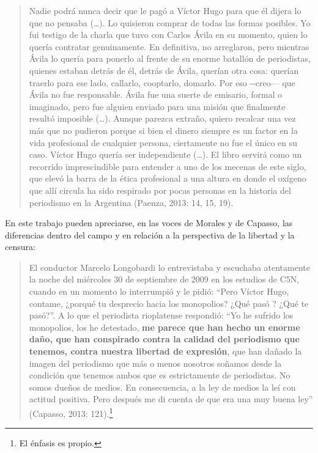 {\begin{quote}
Nadie podrá nunca decir que le pagó a Víctor Hugo para que él dijera lo que no pensaba (\ldots). Lo quisieron comprar de todas las formas posibles. Yo fui testigo de la charla que tuvo con Carlos Ávila en su momento, quien lo quería contratar genuinamente. En definitiva, no arreglaron, pero mientras Ávila lo quería para ponerlo al frente de su enorme batallón de periodistas, quienes estaban detrás de él, detrás de Ávila, querían otra cosa: querían traerlo para ese lado, callarlo, cooptarlo, domarlo. Por eso -\/-creo--- que Ávila no fue responsable. Ávila fue una suerte de emisario, formal o imaginado, pero fue alguien enviado para una misión que finalmente resultó imposible (\ldots). Aunque parezca extraño, quiero recalcar una vez más que no pudieron porque si bien el dinero siempre es un factor en la vida profesional de cualquier persona, ciertamente no fue el único en su caso. Víctor Hugo quería ser independiente (\ldots). El libro servirá como un recorrido imprescindible para entender a uno de los mecenas de este siglo, que elevó la barra de la ética profesional a una altura en donde el oxígeno que allí circula ha sido respirado por pocas personas en la historia del periodismo en la Argentina (Paenza, 2013: 14, 15, 19).
\end{quote}

En este trabajo pueden apreciarse, en las voces de Morales y de Capasso, las diferencias dentro del campo y en relación a la perspectiva de la libertad y la censura:

\begin{quote}
El conductor Marcelo Longobardi lo entrevistaba y escuchaba atentamente la noche del miércoles 30 de septiembre de 2009 en los estudios de C5N, cuando en un momento lo interrumpió y le pidió: ``Pero Víctor Hugo, contame, ¿porqué tu desprecio hacia los monopolios? ¿Qué pasó ? ¿Qué te pasó?''. A lo que el periodista rioplatense respondió: ``Yo he sufrido los monopolios, los he detestado, \textbf{me parece que han hecho un enorme daño, que han conspirado contra la calidad del periodismo que tenemos, contra nuestra libertad de expresión}, que han dañado la imagen del periodismo que más o menos nosotros soñamos desde la condición que tenemos ambos que es estrictamente de periodistas. No somos dueños de medios. En consecuencia, a la ley de medios la leí con actitud positiva. Pero después me di cuenta de que era una muy buena ley'' (Capasso, 2013: 121).\footnote{El énfasis es propio.}
\end{quote}

}
